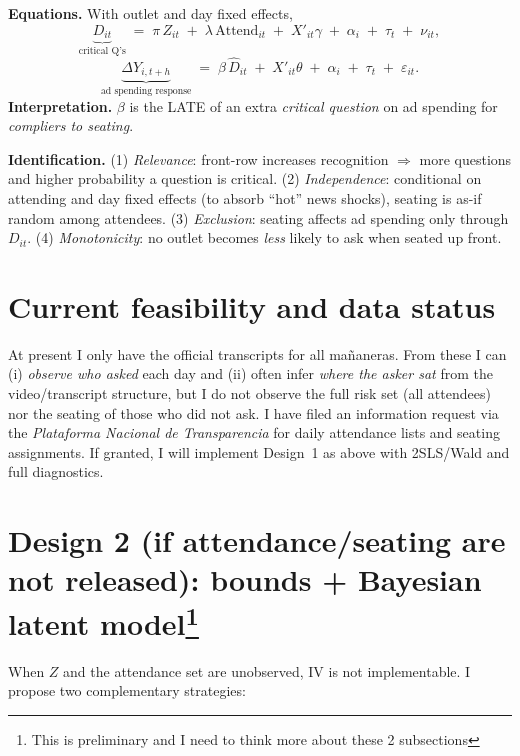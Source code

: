 \documentclass[11pt]{article}
\begin{document}
\textbf{Equations.} With outlet and day fixed effects,
\[
\underbrace{D_{it}}_{\text{critical Q's}}\;=\;\pi\,Z_{it}\;+\;\lambda\,\text{Attend}_{it}\;+\;X'_{it}\gamma\;+\;\alpha_i\;+\;\tau_t\;+\;\nu_{it},
\]
\[
\underbrace{\Delta Y_{i,t+h}}_{\text{ad spending response}}\;=\;\beta\,\widehat{D}_{it}\;+\;X'_{it}\theta\;+\;\alpha_i\;+\;\tau_t\;+\;\varepsilon_{it}.
\]
\textbf{Interpretation.} $\beta$ is the LATE of an extra \emph{critical question} on ad spending for \emph{compliers to seating}.

\textbf{Identification.} (1) \emph{Relevance}: front-row increases recognition $\Rightarrow$ more questions and higher probability a question is critical. (2) \emph{Independence}: conditional on attending and day fixed effects (to absorb ``hot'' news shocks), seating is as-if random among attendees. (3) \emph{Exclusion}: seating affects ad spending only through $D_{it}$. (4) \emph{Monotonicity}: no outlet becomes \emph{less} likely to ask when seated up front.

\section*{Current feasibility and data status}
At present I only have the official transcripts for all mañaneras. From these I can (i) \emph{observe who asked} each day and (ii) often infer \emph{where the asker sat} from the video/transcript structure, but I do not observe the full risk set (all attendees) nor the seating of those who did not ask. I have filed an information request via the \emph{Plataforma Nacional de Transparencia} for daily attendance lists and seating assignments. If granted, I will implement Design~1 as above with 2SLS/Wald and full diagnostics.

\section*{Design 2 (if attendance/seating are not released): bounds + Bayesian latent model\footnote{This is preliminary and I need to think more about these 2 subsections} }
When $Z$ and the attendance set are unobserved, IV is not implementable. I propose two complementary strategies:
\end{document}
